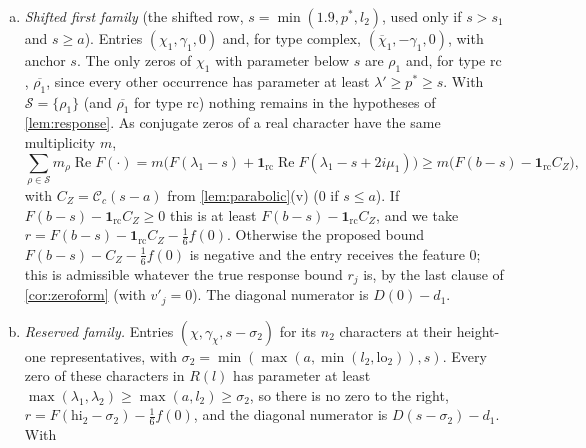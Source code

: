 \documentclass[11pt]{amsart}
\numberwithin{equation}{section}
\theoremstyle{plain}
\theoremstyle{definition}
\theoremstyle{remark}
\renewcommand{\Re}{\operatorname{Re}}
\newcommand{\cS}{\mathcal{S}}
\newcommand{\lo}{\mathrm{lo}}
\newcommand{\hi}{\mathrm{hi}}
\newcommand{\1}{\mathbf{1}}
\newcommand{\bchi}{\overline{\chi}}
\begin{document}
\begin{enumerate}[(a)]
    Condition~2 and we take $R_p,R_q\ge0$; the multiplicities of the kept zeros can then only increase
    the sums. On the last piece $R_p=R_q=0$, which also covers a zero outside the disc (its term is
    then absent). Each same-character pair is a controlled pair with excess
    $(c^{\hi}-d_1)_+$, $c^{\hi}\ge\sup\Re G(-s_1+iy)$, so every diagonal numerator is $D(0)-d_1+(c^{\hi}-d_1)_+$;
    an entry of $\chi_1$ and an entry of $\bchi_1$ form a pair of distinct characters, with the nonprincipal
    quotient $\chi_1^2$, and carry no mutual excess. If $\rho'=\rho_1$ is a double zero, the two
    entries coincide and $r\ge m_{\rho_1}F(\lambda_1-s_1)-\frac16f(0)$ with $m_{\rho_1}\ge2$, which is at least
    both $r_{\gamma_1}$ and $r_{\gamma'}$ (here $y=0$ and $\lambda'=\lambda_1$).
  \item \emph{Shifted first family} (the shifted row, $s=\min(1.9,p^*,l_2)$, used only if $s>s_1$ and
    $s\ge a$). Entries $(\chi_1,\gamma_1,0)$ and, for type $\mathrm{complex}$, $(\bchi_1,-\gamma_1,0)$, with
    anchor $s$. The only zeros of $\chi_1$ with parameter below $s$ are $\rho_1$ and, for type
    $\mathrm{rc}$, $\overline{\rho_1}$, since every other occurrence has parameter at least $\lambda'\ge p^*\ge s$.
    With $\cS=\{\rho_1\}$ (and $\overline{\rho_1}$ for type $\mathrm{rc}$) nothing remains in the hypotheses of
    \cref{lem:response}. As conjugate zeros of a real character have the same multiplicity $m$,
    \[
      \sum_{\rho\in\cS}m_\rho\Re F(\cdot)=m\bigl(F(\lambda_1-s)+\1_{\mathrm{rc}}\Re F(\lambda_1-s+2i\mu_1)\bigr)
      \ge m\bigl(F(b-s)-\1_{\mathrm{rc}}C_Z\bigr),
    \]
    with $C_Z=\mathcal C_c(s-a)$ from \cref{lem:parabolic}(v) ($0$ if $s\le a$). If $F(b-s)-\1_{\mathrm{rc}}C_Z\ge0$
    this is at least $F(b-s)-\1_{\mathrm{rc}}C_Z$, and we take $r=F(b-s)-\1_{\mathrm{rc}}C_Z-\frac16f(0)$.
    Otherwise the proposed bound $F(b-s)-C_Z-\frac16f(0)$ is negative and the entry receives the feature
    $0$; this is admissible whatever the true response bound $r_j$ is, by the last clause of
    \cref{cor:zeroform} (with $v'_j=0$). The diagonal numerator is $D(0)-d_1$.
  \item \emph{Reserved family.} Entries $(\chi,\gamma_\chi,s-\sigma_2)$ for its $n_2$ characters at their
    height-one representatives, with $\sigma_2=\min(\max(a,\min(l_2,\lo_2)),s)$. Every zero of these
    characters in $R(l)$ has parameter at least $\max(\lambda_1,\lambda_2)\ge\max(a,l_2)\ge\sigma_2$, so there is no
    zero to the right, $r=F(\hi_2-\sigma_2)-\frac16f(0)$, and the diagonal numerator is $D(s-\sigma_2)-d_1$. With

\end{enumerate}
\end{document}
